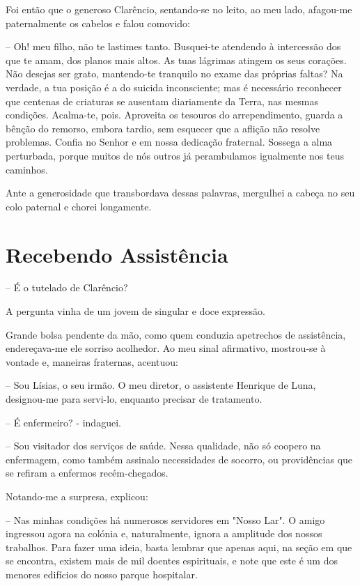 \documentclass[portuguese,12pt,a4paper]{scrbook}
\begin{document}
	Foi então que o generoso Clarêncio, sentando-se no leito, ao meu lado, afagou-me paternalmente os cabelos e falou comovido:
	
	– Oh! meu filho, não te lastimes tanto. Busquei-te atendendo à intercessão dos que te amam, dos planos mais altos. As tuas lágrimas atingem os seus corações. Não desejas ser grato, mantendo-te tranquilo no exame das próprias faltas? Na verdade, a tua posição é a do suicida inconsciente; mas é necessário reconhecer que centenas de criaturas se ausentam diariamente da Terra, nas mesmas condições. Acalma-te, pois. Aproveita os tesouros do arrependimento, guarda a bênção do remorso, embora tardio, sem esquecer que a aflição não resolve problemas. Confia no Senhor e em nossa dedicação fraternal. Sossega a alma perturbada, porque muitos de nós outros já perambulamos igualmente nos teus caminhos.
	
	Ante a generosidade que transbordava dessas palavras, mergulhei a cabeça no seu colo paternal e chorei longamente.
	
	
	\chapter{Recebendo Assistência}
	
	– É o tutelado de Clarêncio?
	
	A pergunta vinha de um jovem de singular e doce expressão.
	
	Grande bolsa pendente da mão, como quem conduzia apetrechos de assistência, endereçava-me ele sorriso acolhedor. Ao meu sinal afirmativo, mostrou-se à vontade e, maneiras fraternas, acentuou:
	
	– Sou Lísias, o seu irmão. O meu diretor, o assistente Henrique de Luna, designou-me para servi-lo, enquanto precisar de tratamento.
	
	– É enfermeiro? - indaguei.
	
	– Sou visitador dos serviços de saúde. Nessa qualidade, não só coopero na enfermagem, como também assinalo necessidades de socorro, ou providências que se refiram a enfermos recém-chegados.
	
	Notando-me a surpresa, explicou:
	
	– Nas minhas condições há numerosos servidores em "Nosso Lar". O amigo ingressou agora na colónia e, naturalmente, ignora a amplitude dos nossos trabalhos. Para fazer uma ideia, basta lembrar que apenas aqui, na seção em que se encontra, existem mais de mil doentes espirituais, e note que este é um dos menores edifícios do nosso parque hospitalar.
	
\end{document}
